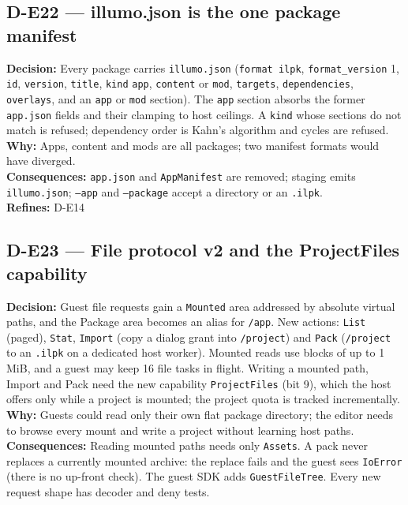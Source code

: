 \subsection*{D-E22 --- illumo.json is the one package manifest}
\begin{decisionbox}[title={D-E22 \quad 2026-09-23}]
\textbf{Decision:} Every package carries \texttt{illumo.json}
(\texttt{format ilpk}, \texttt{format\_version} 1, \texttt{id},
\texttt{version}, \texttt{title}, \texttt{kind} \texttt{app}, \texttt{content}
or \texttt{mod}, \texttt{targets}, \texttt{dependencies}, \texttt{overlays},
and an \texttt{app} or \texttt{mod} section). The \texttt{app} section absorbs
the former \texttt{app.json} fields and their clamping to host ceilings. A
\texttt{kind} whose sections do not match is refused; dependency order is
Kahn's algorithm and cycles are refused.\\
\textbf{Why:} Apps, content and mods are all packages; two manifest formats
would have diverged.\\
\textbf{Consequences:} \texttt{app.json} and \texttt{AppManifest} are removed;
staging emits \texttt{illumo.json}; \texttt{--app} and \texttt{--package}
accept a directory or an \texttt{.ilpk}.\\
\textbf{Refines:} D-E14
\end{decisionbox}

\subsection*{D-E23 --- File protocol v2 and the ProjectFiles capability}
\begin{decisionbox}[title={D-E23 \quad 2026-09-23}]
\textbf{Decision:} Guest file requests gain a \texttt{Mounted} area addressed
by absolute virtual paths, and the Package area becomes an alias for
\texttt{/app}. New actions: \texttt{List} (paged), \texttt{Stat},
\texttt{Import} (copy a dialog grant into \texttt{/project}) and \texttt{Pack}
(\texttt{/project} to an \texttt{.ilpk} on a dedicated host worker). Mounted
reads use blocks of up to 1\,MiB, and a guest may keep 16 file tasks in
flight. Writing a mounted path, Import and Pack need the new capability
\texttt{ProjectFiles} (bit 9), which the host offers only while a project is
mounted; the project quota is tracked incrementally.\\
\textbf{Why:} Guests could read only their own flat package directory; the
editor needs to browse every mount and write a project without learning host
paths.\\
\textbf{Consequences:} Reading mounted paths needs only \texttt{Assets}.
A pack never replaces a currently mounted archive: the replace fails and the
guest sees \texttt{IoError} (there is no up-front check). The guest SDK adds
\texttt{GuestFileTree}. Every new request shape has decoder and deny tests.
\end{decisionbox}

